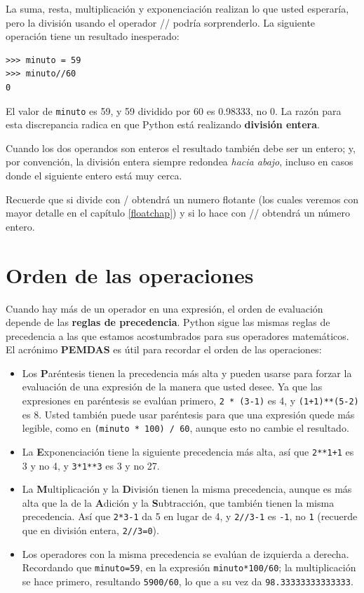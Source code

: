 La suma, resta, multiplicación y exponenciación realizan lo que usted
esperaría, pero la división usando el operador // podría sorprenderlo.
La siguiente operación tiene un resultado inesperado:

\begin{verbatim}
>>> minuto = 59
>>> minuto//60
0
\end{verbatim}

El valor de \texttt{minuto} es 59, y 59 dividido por 60 es 0.98333,
no 0. La razón para esta discrepancia radica en que Python está realizando
\textbf{división entera}.


Cuando los dos operandos son enteros el resultado también debe ser
un entero; y, por convención, la división entera siempre redondea
{\em hacia abajo}, incluso en casos donde el siguiente entero está
muy cerca.

Recuerde que si divide con / obtendrá un numero flotante (los cuales
veremos con mayor detalle en el capítulo \ref{floatchap}) y si lo
hace con // obtendrá un número entero. 

\section{Orden de las operaciones}

 

Cuando hay más de un operador en una expresión, el orden de evaluación
depende de las \textbf{reglas de precedencia}. Python sigue las mismas
reglas de precedencia a las que estamos acostumbrados para sus operadores
matemáticos. El acrónimo \textbf{PEMDAS} es útil para recordar el
orden de las operaciones:
\begin{itemize}
\item Los \textbf{P}aréntesis tienen la precedencia más alta y pueden usarse
para forzar la evaluación de una expresión de la manera que usted
desee. Ya que las expresiones en paréntesis se evalúan primero, \texttt{2
{*} (3-1)} es 4, y \texttt{(1+1){*}{*}(5-2)} es 8. Usted también puede
usar paréntesis para que una expresión quede más legible, como en
\texttt{(minuto {*} 100) / 60}, aunque esto no cambie el resultado.
\item La \textbf{E}xponenciación tiene la siguiente precedencia más alta,
así que \texttt{2{*}{*}1+1} es 3 y no 4, y \texttt{3{*}1{*}{*}3} es
3 y no 27.
\item La \textbf{M}ultiplicación y la \textbf{D}ivisión tienen la misma
precedencia, aunque es más alta que la de la \textbf{A}dición y la
\textbf{S}ubtracción, que también tienen la misma precedencia. Así
que \texttt{2{*}3-1} da 5 en lugar de 4, y \texttt{2//3-1} es \texttt{-1},
no \texttt{1} (recuerde que en división entera, \texttt{2//3=0}).
\item Los operadores con la misma precedencia se evalúan de izquierda a
derecha. Recordando que \texttt{minuto=59}, en la expresión \texttt{minuto{*}100/60};
la multiplicación se hace primero, resultando \texttt{5900/60}, lo
que a su vez da \texttt{98.33333333333333}.
\end{itemize}

